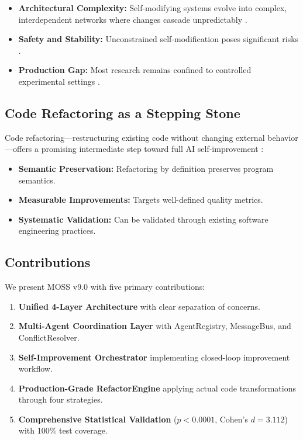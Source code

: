 \documentclass[11pt,a4paper]{article}
\begin{document}
\begin{itemize}
    \item \textbf{Architectural Complexity:} Self-modifying systems evolve into complex, interdependent networks where changes cascade unpredictably \cite{yampolskiy2015}.
    \item \textbf{Safety and Stability:} Unconstrained self-modification poses significant risks \cite{amodei2016}.
    \item \textbf{Production Gap:} Most research remains confined to controlled experimental settings \cite{sculley2015}.
\end{itemize}

\subsection{Code Refactoring as a Stepping Stone}

Code refactoring---restructuring existing code without changing external behavior---offers a promising intermediate step toward full AI self-improvement \cite{fowler1999}:

\begin{itemize}
    \item \textbf{Semantic Preservation:} Refactoring by definition preserves program semantics.
    \item \textbf{Measurable Improvements:} Targets well-defined quality metrics.
    \item \textbf{Systematic Validation:} Can be validated through existing software engineering practices.
\end{itemize}

\subsection{Contributions}

We present MOSS v9.0 with five primary contributions:

\begin{enumerate}
    \item \textbf{Unified 4-Layer Architecture} with clear separation of concerns.
    \item \textbf{Multi-Agent Coordination Layer} with AgentRegistry, MessageBus, and ConflictResolver.
    \item \textbf{Self-Improvement Orchestrator} implementing closed-loop improvement workflow.
    \item \textbf{Production-Grade RefactorEngine} applying actual code transformations through four strategies.
    \item \textbf{Comprehensive Statistical Validation} ($p<0.0001$, Cohen's $d=3.112$) with 100\% test coverage.
\end{enumerate}
\end{document}
